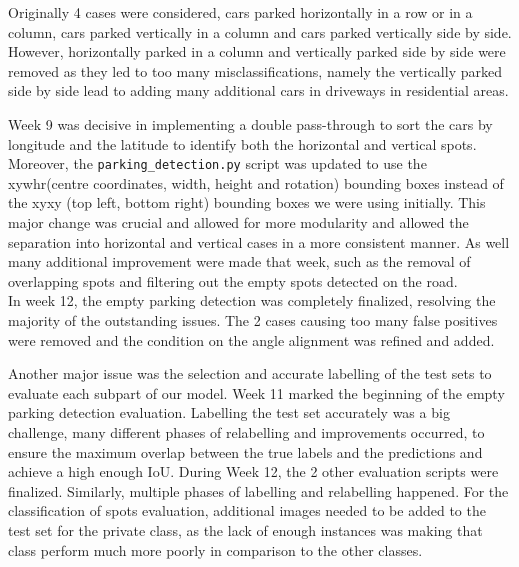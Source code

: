 Originally 4 cases were considered, cars parked horizontally in a row or in a
column, cars parked vertically in a column and cars parked vertically side by
side. However, horizontally parked in a column and vertically parked side by side
were removed as they led to too many misclassifications, namely the vertically
parked side by side lead to adding many additional cars in driveways in
residential areas.

Week 9 was decisive in implementing a double pass-through to sort the cars by
longitude and the latitude to identify both the horizontal and vertical spots.
Moreover, the \texttt{parking\_detection.py} script was updated to use the
xywhr(centre coordinates, width, height and rotation) bounding boxes instead of
the xyxy (top left, bottom right)  bounding boxes we were using initially. This
major change was crucial and allowed for more modularity and allowed the
separation into horizontal and vertical cases in a more consistent manner. As
well many additional improvement were made that week, such as the removal of
overlapping spots and filtering out the empty spots detected on the road.\\
In week 12, the empty parking detection was completely finalized, resolving the
majority of the outstanding issues. The 2 cases causing too many false positives
were removed and the condition on the angle alignment was refined and added.

Another major issue was the selection and accurate labelling of the test sets to
evaluate each subpart of our model. Week 11 marked the beginning of the empty
parking detection evaluation. Labelling the test set accurately was a big
challenge, many different phases of relabelling and improvements occurred, to
ensure the maximum overlap between the true labels and the predictions and
achieve a high enough IoU. During Week 12, the 2 other evaluation scripts were
finalized. Similarly, multiple phases of labelling and relabelling happened. For
the classification of spots evaluation, additional images needed to be added to
the test set for the private class, as the lack of enough instances was making
that class perform much more poorly in comparison to the other classes.

\newpage{}